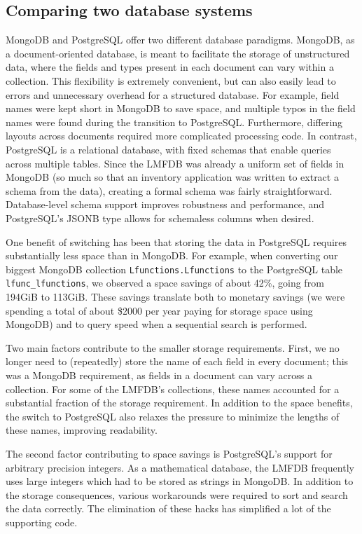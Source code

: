 \documentclass{amsart}
\begin{document}
\subsection{Comparing two database systems}

MongoDB and PostgreSQL offer two different database paradigms.
MongoDB, as a document-oriented database, is meant to facilitate the storage of unstructured data, where the fields and types present in each document can vary within a collection.
This flexibility is extremely convenient, but can also easily lead to errors and unnecessary overhead for a structured database.
For example, field names were kept short in MongoDB to save space, and multiple typos in the field names were found during the transition to PostgreSQL.
Furthermore, differing layouts across documents required more complicated processing code.
In contrast, PostgreSQL is a relational database, with fixed schemas that enable queries across multiple tables.
Since the LMFDB was already a uniform set of fields in MongoDB (so much so that an inventory application was written to extract a schema from the data), creating a formal schema was fairly straightforward.
Database-level schema support improves robustness and performance, and PostgreSQL's JSONB type allows for schemaless columns when desired.


One benefit of switching has been that storing the data in PostgreSQL requires substantially less space than in MongoDB.
For example, when converting our biggest MongoDB collection \texttt{Lfunctions.Lfunctions} to the PostgreSQL table \texttt{lfunc\_lfunctions}, we observed a space savings of about 42\%, going from 194GiB to 113GiB.
These savings translate both to monetary savings (we were spending a total of about \$2000 per year paying for storage space using MongoDB) and to query speed when a sequential search is performed.



Two main factors contribute to the smaller storage requirements.
First, we no longer need to (repeatedly) store the name of each field in every document; this was a MongoDB requirement, as fields in a document can vary across a collection.
For some of the LMFDB's collections, these names accounted for a substantial fraction of the storage requirement.
In addition to the space benefits, the switch to PostgreSQL also relaxes the pressure to minimize the lengths of these names, improving readability.

The second factor contributing to space savings is PostgreSQL's support for arbitrary precision integers.
As a mathematical database, the LMFDB frequently uses large integers which had to be stored as strings in MongoDB.
In addition to the storage consequences, various workarounds were required to sort and search the data correctly.
The elimination of these hacks has simplified a lot of the supporting code.
\end{document}
